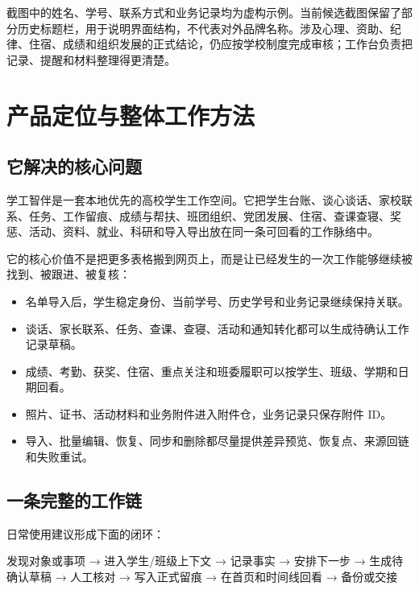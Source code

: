 \documentclass[UTF8,zihao=-4,oneside]{ctexrep}
\newcommand{\productname}{学工智伴}
\begin{document}
截图中的姓名、学号、联系方式和业务记录均为虚构示例。当前候选截图保留了部分历史标题栏，用于说明界面结构，不代表对外品牌名称。涉及心理、资助、纪律、住宿、成绩和组织发展的正式结论，仍应按学校制度完成审核；工作台负责把记录、提醒和材料整理得更清楚。

\tableofcontents
\clearpage
\listoffigures
\clearpage
{}

\chapter{产品定位与整体工作方法}

\section{它解决的核心问题}

\productname{}是一套本地优先的高校学生工作空间。它把学生台账、谈心谈话、家校联系、任务、工作留痕、成绩与帮扶、班团组织、党团发展、住宿、查课查寝、奖惩、活动、资料、就业、科研和导入导出放在同一条可回看的工作脉络中。

它的核心价值不是把更多表格搬到网页上，而是让已经发生的一次工作能够继续被找到、被跟进、被复核：

\begin{itemize}
  \item 名单导入后，学生稳定身份、当前学号、历史学号和业务记录继续保持关联。
  \item 谈话、家长联系、任务、查课、查寝、活动和通知转化都可以生成待确认工作记录草稿。
  \item 成绩、考勤、获奖、住宿、重点关注和班委履职可以按学生、班级、学期和日期回看。
  \item 照片、证书、活动材料和业务附件进入附件仓，业务记录只保存附件 ID。
  \item 导入、批量编辑、恢复、同步和删除都尽量提供差异预览、恢复点、来源回链和失败重试。
\end{itemize}

\section{一条完整的工作链}

日常使用建议形成下面的闭环：

\begin{workflowbox}
发现对象或事项 → 进入学生/班级上下文 → 记录事实 → 安排下一步 → 生成待确认草稿 → 人工核对 → 写入正式留痕 → 在首页和时间线回看 → 备份或交接
\end{workflowbox}
\end{document}

